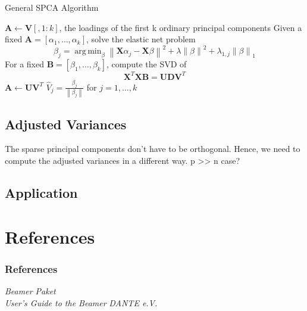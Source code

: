\documentclass{beamer}
\theoremstyle{plain}
\theoremstyle{definition}
\newcommand{\mat}[1]{\mathbf{#1}}
\DeclareMathOperator*{\argmin}{arg\,min}
\newcommand{\norm}[1]{\left\lVert #1 \right\rVert}
\begin{document}
\begin{frame}
\begin{algorithm}[H]
  \scriptsize
    \caption{General SPCA Algorithm}
    \begin{algorithmic}[1]
        	\State $\mat A \gets \mat V[,1 \colon k]$, the loadings of the first k ordinary principal components
                \State Given a fixed $\mat A = [\alpha_1, \ldots, \alpha_k]$, solve the elastic net problem $$\beta_j = \argmin_{\beta} \norm{\mat X \alpha_j - \mat X \beta}^{2} + \lambda \norm{\beta}^2 + \lambda_{1,j}\norm{\beta}_{1}$$
                \State For a fixed $\mat B = [\beta_1, \ldots, \beta_k]$, compute the SVD of $$\mat X^T \mat X \mat B = \mat U \mat D \mat V^T$$
                \State $\mat A \gets \mat U \mat V^T$
            \EndWhile
            \State $\hat{V}_j = \frac{\beta_j}{\norm{\beta_j}}$ for $j = 1, \ldots, k$
        \EndProcedure
    \end{algorithmic}
\end{algorithm} 
\end{frame}

\subsection{Adjusted Variances}
\begin{frame}
The sparse principal components don't have to be orthogonal. Hence, we need to compute the adjusted variances in a different way.
p >> n case?
\end{frame}

\subsection{Application}
\begin{frame}
\end{frame}



\section{References}
\begin{frame}

\frametitle{References}

\begin{thebibliography}{9}
 \emph{Beamer Paket} \\ 
 \emph{User's Guide to the Beamer} 
 \emph{DANTE e.V.}    
\end{thebibliography}


\end{frame}
\end{document}

